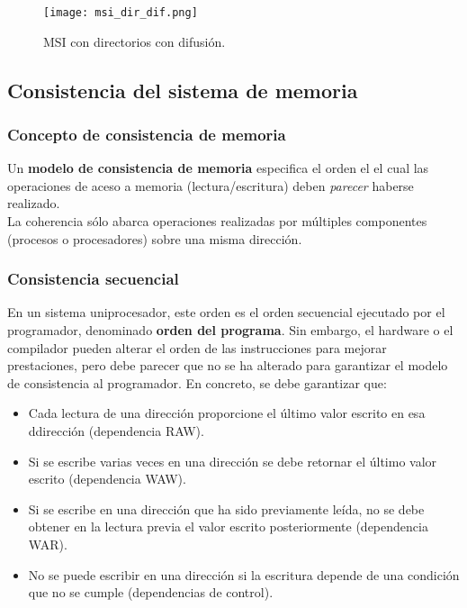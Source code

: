 \documentclass[12pt,spanish]{article}
\begin{document}
\begin{figure}[H]
\centering
\texttt{[image: msi\_dir\_dif.png]}
\caption{MSI con directorios con difusión.}
\end{figure}

\subsection{Consistencia del sistema de memoria}

\subsubsection{Concepto de consistencia de memoria}

Un \textbf{modelo de consistencia de memoria} especifica el orden el el cual las operaciones de aceso a memoria (lectura/escritura) deben \textit{parecer} haberse realizado.\\

La coherencia sólo abarca operaciones realizadas por múltiples componentes (procesos o procesadores) sobre una misma dirección.\\


\subsubsection{Consistencia secuencial}

En un sistema uniprocesador, este orden es el orden secuencial ejecutado por el programador, denominado \textbf{orden del programa}. Sin embargo, el hardware o el compilador pueden alterar el orden de las instrucciones para mejorar prestaciones, pero debe parecer que no se ha alterado para garantizar el modelo de consistencia al programador. En concreto, se debe garantizar que:

\begin{itemize}
	\item Cada lectura de una dirección proporcione el último valor escrito en esa ddirección (dependencia RAW).
	\item Si se escribe varias veces en una dirección se debe retornar el último valor escrito (dependencia WAW).
	\item Si se escribe en una dirección que ha sido previamente leída, no se debe obtener en la lectura previa el valor escrito posteriormente (dependencia WAR).
	\item No se puede escribir en una dirección si la escritura depende de una condición que no se cumple (dependencias de control).
\end{itemize}
\end{document}
